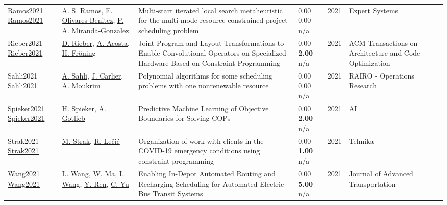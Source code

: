 {\begin{longtable}{p{3cm}p{5cm}p{10cm}p{1cm}rp{2.5cm}l}
Ramos2021 \href{http://dx.doi.org/10.1111/exsy.12830}{Ramos2021} & \hyperref[auth:a1731]{A. S. Ramos}, \hyperref[auth:a1736]{E. Olivares‐Benitez}, \hyperref[auth:a1737]{P. A. Miranda‐Gonzalez} & Multi‐start iterated local search metaheuristic for the multi‐mode resource‐constrained project scheduling problem & \noindent{}\textcolor{black!50}{0.00} \textcolor{black!50}{0.00} n/a & 2021 & Expert Systems & \cite{Ramos2021}\\
Rieber2021 \href{http://dx.doi.org/10.1145/3487922}{Rieber2021} & \hyperref[auth:a1890]{D. Rieber}, \hyperref[auth:a1891]{A. Acosta}, \hyperref[auth:a1892]{H. Fröning} & \cellcolor{gold!20}Joint Program and Layout Transformations to Enable Convolutional Operators on Specialized Hardware Based on Constraint Programming & \noindent{}\textcolor{black!50}{0.00} \textbf{2.00} n/a & 2021 & ACM Transactions on Architecture and Code Optimization & \cite{Rieber2021}\\
Sahli2021 \href{http://dx.doi.org/10.1051/ro/2021164}{Sahli2021} & \hyperref[auth:a928]{A. Sahli}, \hyperref[auth:a845]{J. Carlier}, \hyperref[auth:a1170]{A. Moukrim} & \cellcolor{gold!20}Polynomial algorithms for some scheduling problems with one nonrenewable resource & \noindent{}\textcolor{black!50}{0.00} \textcolor{black!50}{0.00} n/a & 2021 & RAIRO - Operations Research & \cite{Sahli2021}\\
Spieker2021 \href{http://dx.doi.org/10.3390/ai2040033}{Spieker2021} & \hyperref[auth:a196]{H. Spieker}, \hyperref[auth:a195]{A. Gotlieb} & \cellcolor{gold!20}Predictive Machine Learning of Objective Boundaries for Solving COPs & \noindent{}\textcolor{black!50}{0.00} \textbf{2.00} n/a & 2021 & AI & \cite{Spieker2021}\\
Strak2021 \href{http://dx.doi.org/10.5937/tehnika2102239s}{Strak2021} & \hyperref[auth:a2027]{M. Strak}, \hyperref[auth:a2028]{R. Lečić} & Organization of work with clients in the COVID-19 emergency conditions using constraint programming & \noindent{}\textcolor{black!50}{0.00} \textbf{1.00} n/a & 2021 & Tehnika & \cite{Strak2021}\\
Wang2021 \href{http://dx.doi.org/10.1155/2021/5531063}{Wang2021} & \hyperref[auth:a1968]{L. Wang}, \hyperref[auth:a1969]{W. Ma}, \hyperref[auth:a1970]{L. Wang}, \hyperref[auth:a1971]{Y. Ren}, \hyperref[auth:a1972]{C. Yu} & \cellcolor{gold!20}Enabling In-Depot Automated Routing and Recharging Scheduling for Automated Electric Bus Transit Systems & \noindent{}\textcolor{black!50}{0.00} \textbf{5.00} n/a & 2021 & Journal of Advanced Transportation & \cite{Wang2021}\\

\end{longtable}}
